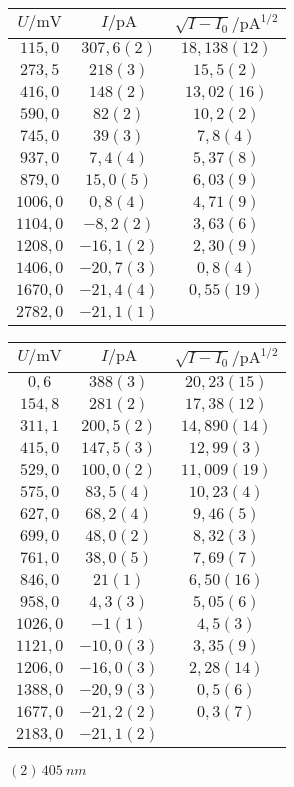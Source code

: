 \begin{figure}[htbp]
   \centering
\parbox{0.475\linewidth}{\centering
\begin{tabular}{c c c}
\hline$U / \unit{\milli\volt}$ & $I / \unit{\pico\ampere}$ & $\sqrt{I-I_0} / \unit{\pico\ampere\tothe{1/2}}$ \\ 
\hline
$115,0$ & $307,6(2)$ & $18,138(12)$ \\
$273,5$ & $218(3)$ & $15,5(2)$ \\
$416,0$ & $148(2)$ & $13,02(16)$ \\
$590,0$ & $82(2)$ & $10,2(2)$ \\
$745,0$ & $39(3)$ & $7,8(4)$ \\
$937,0$ & $7,4(4)$ & $5,37(8)$ \\
$879,0$ & $15,0(5)$ & $6,03(9)$ \\
$1006,0$ & $0,8(4)$ & $4,71(9)$ \\
$1104,0$ & $-8,2(2)$ & $3,63(6)$ \\
$1208,0$ & $-16,1(2)$ & $2,30(9)$ \\
$1406,0$ & $-20,7(3)$ & $0,8(4)$ \\
$1670,0$ & $-21,4(4)$ & $0,55(19)$ \\
$2782,0$ & $-21,1(1)$ &    \\
\hline\end{tabular}
\caption{$(1)\,\SI{405}{nm}$}
}\quad\parbox{0.475\linewidth}{\centering
\begin{tabular}{c c c}
\hline$U / \unit{\milli\volt}$ & $I / \unit{\pico\ampere}$ & $\sqrt{I-I_0} / \unit{\pico\ampere\tothe{1/2}}$ \\ 
\hline
$0,6$ & $388(3)$ & $20,23(15)$ \\
$154,8$ & $281(2)$ & $17,38(12)$ \\
$311,1$ & $200,5(2)$ & $14,890(14)$ \\
$415,0$ & $147,5(3)$ & $12,99(3)$ \\
$529,0$ & $100,0(2)$ & $11,009(19)$ \\
$575,0$ & $83,5(4)$ & $10,23(4)$ \\
$627,0$ & $68,2(4)$ & $9,46(5)$ \\
$699,0$ & $48,0(2)$ & $8,32(3)$ \\
$761,0$ & $38,0(5)$ & $7,69(7)$ \\
$846,0$ & $21(1)$ & $6,50(16)$ \\
$958,0$ & $4,3(3)$ & $5,05(6)$ \\
$1026,0$ & $-1(1)$ & $4,5(3)$ \\
$1121,0$ & $-10,0(3)$ & $3,35(9)$ \\
$1206,0$ & $-16,0(3)$ & $2,28(14)$ \\
$1388,0$ & $-20,9(3)$ & $0,5(6)$ \\
$1677,0$ & $-21,2(2)$ & $0,3(7)$ \\
$2183,0$ & $-21,1(2)$ &    \\
\hline\end{tabular}
\caption{$(2)\,\SI{405}{nm}$}
}\end{figure}